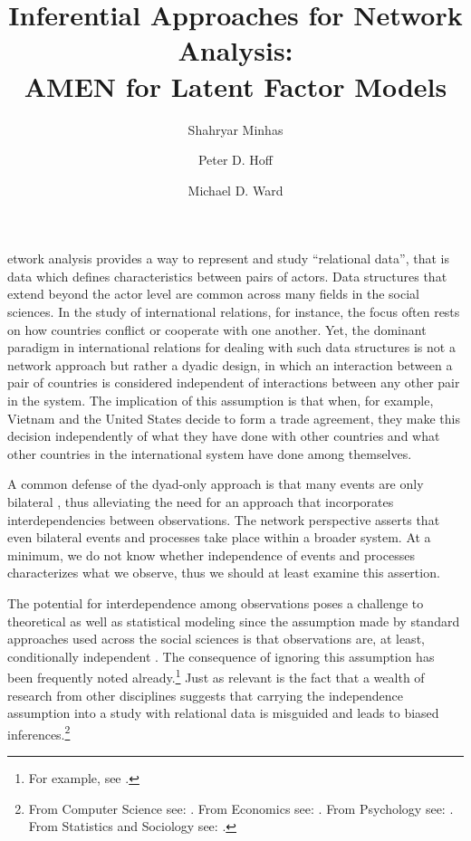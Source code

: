 \documentclass[9pt,twocolumn,twoside,lineno]{pnas-new}
\title{Inferential Approaches for Network Analysis: \\ AMEN for Latent Factor Models}
\author[a,c,1]{Shahryar Minhas}
\author[b,1,2]{Peter D. Hoff}
\author[a]{Michael D. Ward}
\affil[a]{Department of Political Science, Michigan State University, East Lansing, MI 48824, USA}
\affil[b]{Departments of Statistics, Duke University, Durham, NC 27701, USA}
\affil[c]{Department of Political Science, Duke University, Durham, NC 27701, USA}
\begin{document}
\verticaladjustment{-2pt}

\maketitle
\thispagestyle{firststyle}

etwork analysis provides a way to represent and study ``relational data'', that is data which defines characteristics between pairs of actors. Data structures that extend beyond the actor level are common across many fields in the social sciences. In the study of international relations, for instance, the focus often rests on how countries conflict or cooperate with one another. Yet, the dominant paradigm in international relations for dealing with such data structures is not a network approach but rather a dyadic design, in which an interaction between a pair of countries is considered independent of interactions between any other pair in the system. The implication of this assumption is that when, for example, Vietnam and the United States decide to form a trade agreement, they make this decision independently of what they have done with other countries and what other countries in the international system have done among themselves.

A common defense of the dyad-only approach is that many events are only bilateral \citep{diehl:wright:2016}, thus alleviating the need for an approach that incorporates interdependencies between observations. The network perspective asserts that even bilateral events and processes take place within a broader system. At a minimum, we do not know whether independence of events and processes characterizes what we observe, thus we should at least examine this assertion.  

The potential for interdependence among observations poses a challenge to theoretical as well as statistical modeling since the assumption made by standard approaches used across the social sciences is that observations are, at least, conditionally independent \citep{snijders:2011}. The consequence of ignoring this assumption has been frequently noted already.\footnote{For example, see \cite{beck:etal:1998,signorino:1999,aronow:etal:2015}.}  Just as relevant is the fact that a wealth of research from other disciplines suggests that carrying the independence assumption into a study with relational data is misguided and leads to biased inferences.\footnote{From Computer Science see: \cite{bonabeau:2002,brandes:erlebach:2005}. From Economics see: \cite{goyal:2012,jackson:2014}. From Psychology see: \cite{pattison:wasserman:1999,kenny:etal:2006}. From Statistics and Sociology see: \cite{snijders:1996,hoff:etal:2002}.} 
\end{document}
